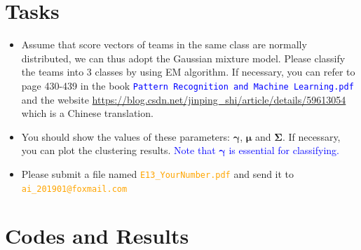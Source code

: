 \documentclass[a4paper, 11pt]{article}
\numberwithin{equation}{subsection}
\begin{document}
\section{Tasks}
\begin{itemize}
	\item Assume that score vectors of teams in the same class are normally distributed, we can thus adopt the Gaussian mixture model. Please classify the teams into 3 classes by using EM algorithm. If necessary, you can refer to page 430-439 in the book \textcolor{blue}{\texttt{Pattern Recognition and Machine Learning.pdf}} and the website \textcolor{	orange}{\url{https://blog.csdn.net/jinping_shi/article/details/59613054}} which is a Chinese translation.
	\item You should show the values of these parameters: $\boldsymbol\gamma$, $\boldsymbol\mu$ and $\boldsymbol\Sigma$. If necessary, you can plot the clustering results. \textcolor{blue}{Note that $\boldsymbol\gamma$ is essential for classifying.}
	\item Please submit a file named \textcolor{orange}{\texttt{E13\_YourNumber.pdf}} and send it to \textcolor{orange}{\texttt{ai\_201901@foxmail.com}}
\end{itemize}
\section{Codes and Results}
\end{document}
